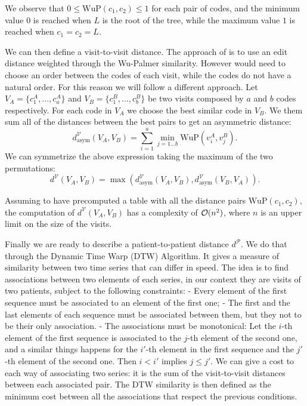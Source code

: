 \documentclass[]{marticle}
\newcommand{\patients}{\mathcal{P}}
\newcommand{\visits}{\mathcal{V}}
\begin{document}
We observe that $0 \leq \text{WuP}(c_1, c_2) \leq 1$ for each pair of codes, and the minimum value $0$ is
reached when $L$ is the root of the tree, while the maximum value $1$ is reached when $c_1 = c_2 =
L$.

We can then define a visit-to-visit distance. The approach of \cite{panigutti-xai} is to use an edit
distance weighted through the Wu-Palmer similarity. However would need to choose an order between
the codes of each visit, while the codes do not have a natural order. For this reason we will follow
a different approach. Let $V_A = \{c^A_1, ..., c^A_a\}$ and $V_B = \{c^B_1,..., c^B_b\}$ be two visits
composed by $a$ and $b$ codes respectively. For each code in $V_A$ we choose the best similar code
in $V_B$. We them sum all of the distances between the best pairs to get an asymmetric distance:
$$ d^\visits _\text{asym} (V_A, V_B) = \sum_{i=1}^a \min_{j=1...b} \text{WuP}(v^A_i, v^B_j). $$
We can symmetrize the above expression taking the maximum of the two permutations:
$$ d^\visits  (V_A, V_B) = \max(d^\visits _\text{asym} (V_A, V_B), d^\visits _\text{asym} (V_B, V_A)). $$

Assuming to have precomputed a table with all the distance pairs $\text{WuP}(c_1, c_2)$, the computation
of $d^\visits (V_A, V_B)$ has a complexity of $\mathcal{O}(n^2)$, where $n$ is an upper limit on the
size of the visits.

Finally we are ready to describe a patient-to-patient distance $d^\patients$. We do that through
the Dynamic Time Warp (DTW) Algorithm. It gives a measure of similarity between two time series that can
differ in speed. The idea is to find associations between two elements of each series, in our
context they are visits of two patients, subject to the following constraints:
- Every element of the first sequence must be associated to an element of the first one;
- The first and the last elements of each sequence must be associated between them, but they not to
  be their only association.
- The associations must be monotonical: Let the $i$-th element of the first sequence is associated
  to the $j$-th element of the second one, and a similar things happens for the $i'$-th element in
  the first sequence and the $j'$-th element of the second one. Then $i<i'$ implies $j\leq j'$.
We can give a cost to each way of associating two series: it is the sum of the visit-to-visit
distances between each associated pair. The DTW similarity is then defined as the minimum cost
between all the associations that respect the previous conditions.
\end{document}

